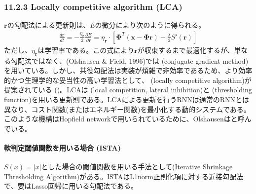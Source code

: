 \documentclass[letterpaper,10pt,english]{sphinxmanual}
\begin{document}
\subsubsection{11.2.3 Locally competitive algorithm (LCA)}
\label{\detokenize{11-2_sparse-coding:locally-competitive-algorithm-lca}}
\(\mathbf{r}\)の勾配法による更新則は、\(E\)の微分により次のように得られる。
\begin{equation*}
\begin{split}
\frac{d \mathbf{r}}{dt}= -\frac{\eta_\mathbf{r}}{2}\frac{\partial E}{\partial \mathbf{r}}=\eta_\mathbf{r} \cdot\left[\mathbf{\Phi}^T (\mathbf{x}-\mathbf{\Phi}\mathbf{r})- \frac{\lambda}{2}S'\left(\mathbf{r}\right)\right]
\end{split}
\end{equation*}
ただし、\(\eta_{\mathbf{r}}\)は学習率である。この式により\(\mathbf{r}\)が収束するまで最適化するが、単なる勾配法ではなく、(Olshausen \& Field, 1996)では (conjugate gradient method)を用いている。しかし、共役勾配法は実装が煩雑で非効率であるため、より効率的かつ生理学的な妥当性の高い学習法として、  (locally competitive algorithm)が提案されている ()。LCAは (local competition, lateral inhibition)と (thresholding function)を用いる更新則である。LCAによる更新を行うRNNは通常のRNNとは異なり、コスト関数(またはエネルギー関数)を最小化する動的システムである。このような機構はHopfield networkで用いられているために、Olshausenはと呼んでいる。


\paragraph{軟判定閾値関数を用いる場合 (ISTA)}
\label{\detokenize{11-2_sparse-coding:ista}}
\(S(x)=|x|\)とした場合の閾値関数を用いる手法として(Iterative Shrinkage Thresholding Algorithm)がある。ISTAはL1\sphinxhyphen{}norm正則化項に対する近接勾配法で、要はLasso回帰に用いる勾配法である。
\end{document}
